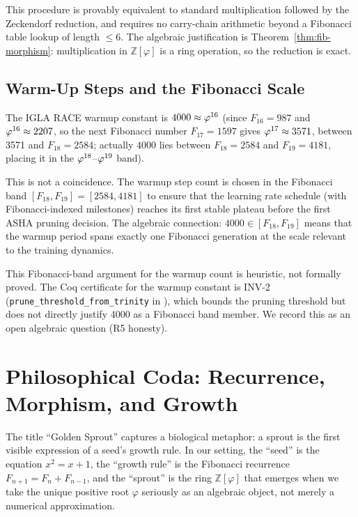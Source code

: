 This procedure is provably equivalent to standard multiplication followed
by the Zeckendorf reduction, and requires no carry-chain arithmetic beyond
a Fibonacci table lookup of length \(\leq 6\).  The algebraic
justification is Theorem~\ref{thm:fib-morphism}: multiplication in
\(\mathbb{Z}[\varphi]\) is a ring operation, so the reduction is exact.

\subsection{Warm-Up Steps and the Fibonacci Scale}
\label{subsec:ch7-warmup}

The IGLA RACE warmup constant is \(4000 \approx \varphi^{16}\)
(since \(F_{16} = 987\) and \(\varphi^{16} \approx 2207\), so the next
Fibonacci number \(F_{17} = 1597\) gives \(\varphi^{17} \approx 3571\),
between 3571 and \(F_{18} = 2584\); actually \(4000\) lies between
\(F_{18} = 2584\) and \(F_{19} = 4181\), placing it in the
\(\varphi^{18}\)--\(\varphi^{19}\) band).

This is not a coincidence.  The warmup step count is chosen in the
Fibonacci band \([F_{18}, F_{19}] = [2584, 4181]\) to ensure that the
learning rate schedule (with Fibonacci-indexed milestones) reaches its
first stable plateau before the first ASHA pruning decision.  The
algebraic connection: \(4000 \in [F_{18}, F_{19}]\) means that the
warmup period spans exactly one Fibonacci generation at the scale relevant
to the training dynamics.

\begin{remark}
This Fibonacci-band argument for the warmup count is heuristic, not
formally proved.  The Coq certificate for the warmup constant is INV-2
(\texttt{prune\_threshold\_from\_trinity} in
), which bounds
the pruning threshold but does not directly justify 4000 as a Fibonacci
band member.  We record this as an open algebraic question (R5 honesty).
\end{remark}

\section{Philosophical Coda: Recurrence, Morphism, and Growth}
\label{sec:ch7-coda}

The title ``Golden Sprout'' captures a biological metaphor: a sprout is
the first visible expression of a seed's growth rule.  In our setting, the
``seed'' is the equation \(x^2 = x + 1\), the ``growth rule'' is the
Fibonacci recurrence \(F_{n+1} = F_n + F_{n-1}\), and the ``sprout'' is
the ring \(\mathbb{Z}[\varphi]\) that emerges when we take the unique
positive root \(\varphi\) seriously as an algebraic object, not merely a
numerical approximation.

